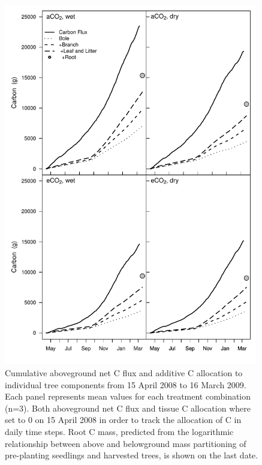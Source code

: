 \documentclass[a4paper]{article}\usepackage[]{graphicx}\usepackage[]{color}
\begin{document}
\begin{figure}[h!]
    \centering
    \includegraphics[width=0.99\textwidth]{treecarbon_daily2.pdf}
    \caption{Cumulative aboveground net C flux and additive C allocation to individual tree components from 15 April 2008 to 16 March 2009. Each panel represents mean values for each treatment combination (n=3). Both aboveground net C flux and tissue C allocation where set to 0 on 15 April 2008 in order to track the allocation of C in daily time steps. Root C mass, predicted from the logarithmic relationship between above and belowground mass partitioning of pre-planting seedlings and harvested trees, is shown on the last date.}
    \label{fig:figure 4.6}
\end{figure}
\end{document}
